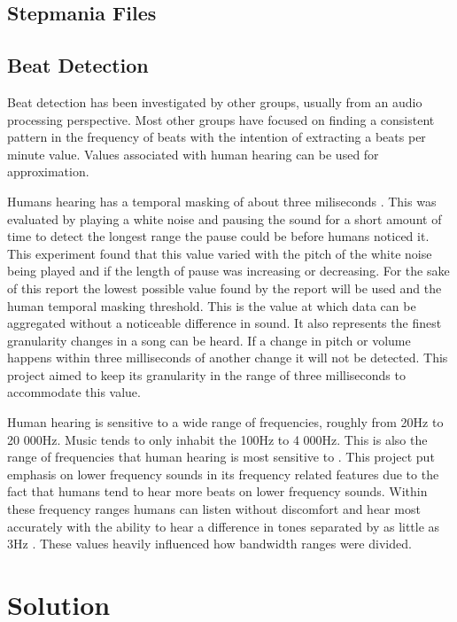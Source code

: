 \documentclass[12pt]{article}
\begin{document}
\subsection{Stepmania Files}



\subsection{Beat Detection}
Beat detection has been investigated by other groups, usually from an audio processing perspective. Most other groups have focused on finding a consistent pattern in the frequency of beats with the intention of extracting a beats per minute value. Values associated with human hearing can be used for approximation.

Humans hearing has a temporal masking of about three miliseconds \cite{temporalmasking}. This was evaluated by playing a white noise and pausing the sound for a short amount of time to detect the longest range the pause could be before humans noticed it. This experiment found that this value varied with the pitch of the white noise being played and if the length of pause was increasing or decreasing. For the sake of this report the lowest possible value found by the report will be used and the human temporal masking threshold. This is the value at which data can be aggregated without a noticeable difference in sound. It also represents the finest granularity changes in a song can be heard. If a change in pitch or volume happens within three milliseconds of another change it will not be detected. This project aimed to keep its granularity in the range of three milliseconds to accommodate this value.

Human hearing is sensitive to a wide range of frequencies, roughly from 20Hz to 20 000Hz\cite{frequencylimits}. Music tends to only inhabit the 100Hz to 4 000Hz. This is also the range of frequencies that human hearing is most sensitive to \cite{frequencylimits}. This project put emphasis on lower frequency sounds in its frequency related features due to the fact that humans tend to hear more beats on lower frequency sounds. Within these frequency ranges humans can listen without discomfort and hear most accurately with the ability to hear a difference in tones separated by as little as 3Hz \cite{frequencylimits}. These values heavily influenced how bandwidth ranges were divided.

\section{Solution}
\end{document}
